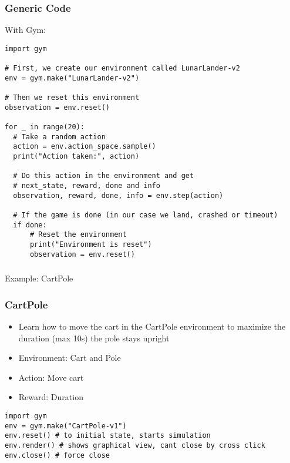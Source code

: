 \begin{frame}[fragile]\frametitle{Generic Code}

With Gym:

\begin{lstlisting}
import gym

# First, we create our environment called LunarLander-v2
env = gym.make("LunarLander-v2")

# Then we reset this environment
observation = env.reset()

for _ in range(20):
  # Take a random action
  action = env.action_space.sample()
  print("Action taken:", action)

  # Do this action in the environment and get
  # next_state, reward, done and info
  observation, reward, done, info = env.step(action)
  
  # If the game is done (in our case we land, crashed or timeout)
  if done:
      # Reset the environment
      print("Environment is reset")
      observation = env.reset()
\end{lstlisting}

\end{frame}



\begin{frame}[fragile]\frametitle{}
\begin{center}
{\Large Example: CartPole}
\end{center}
\end{frame}

\begin{frame}[fragile]\frametitle{CartPole}

\begin{itemize}
\item Learn how to move the cart in the CartPole environment to maximize the duration (max 10s) the pole stays upright
\item Environment: Cart and Pole
\item Action: Move cart
\item Reward: Duration
\end{itemize}

\begin{lstlisting}
import gym
env = gym.make("CartPole-v1")
env.reset() # to initial state, starts simulation
env.render() # shows graphical view, cant close by cross click
env.close() # force close
\end{lstlisting}

\end{frame}

